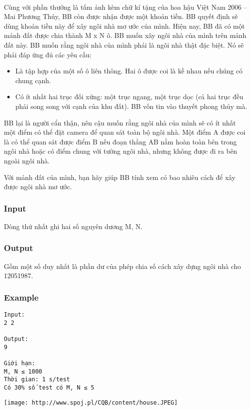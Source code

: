 

 

Cùng với phần thưởng là tấm ảnh kèm chữ kí tặng của hoa hậu Việt Nam 2006 – Mai Phương Thúy, BB còn được nhận được một khoản tiền. BB quyết định sẽ dùng khoản tiền này để xây ngôi nhà mơ ước của mình. Hiện nay, BB đã có một mảnh đất được chia thành M x N ô. BB muốn xây ngôi nhà của mình trên mảnh đất này. BB muốn rằng ngôi nhà của mình phải là ngôi nhà thật đặc biệt. Nó sẽ phải đáp ứng đủ các yêu cầu:
\begin{itemize}
	\item Là tập hợp của một số ô liên thông. Hai ô được coi là kề nhau nếu chúng có chung cạnh.
	\item Có ít nhất hai trục đối xứng: một trục ngang, một trục dọc (cả hai trục đều phải song song với cạnh của khu đất). BB vốn tin vào thuyết phong thủy mà.
\end{itemize}

BB lại là người cẩn thận, nên cậu muốn rằng ngôi nhà của mình sẽ có ít nhất một điểm có thể đặt camera để quan sát toàn bộ ngôi nhà. Một điểm A được coi là có thể quan sát được điểm B nếu đoạn thẳng AB nằm hoàn toàn bên trong ngôi nhà hoặc có điểm chung với tường ngôi nhà, nhưng không được đi ra bên ngoài ngôi nhà.

Với mảnh đất của mình, bạn hãy giúp BB tính xem có bao nhiêu cách để xây được ngôi nhà mơ ước.

\subsubsection{Input}

Dòng thứ nhất ghi hai số nguyên dương M, N.

\subsubsection{Output}

Gồm một số duy nhất là phần dư của phép chia số cách xây dựng ngôi nhà cho 12051987.

\subsubsection{Example}
\begin{verbatim}
Input:
2 2

Output:
9

Giới hạn:
M, N ≤ 1000
Thời gian: 1 s/test
Có 30% số test có M, N ≤ 5 
\end{verbatim}


\texttt{[image: http://www.spoj.pl/CQB/content/house.JPEG]}